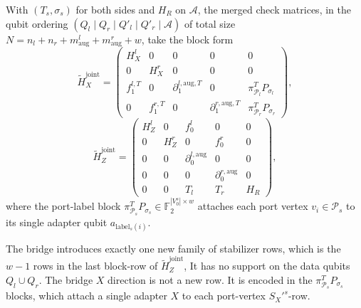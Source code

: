 \documentclass[a4paper, 12pt]{article}
\begin{document}
  With $(T_s, \sigma_s)$ for both sides and $H_R$ on $\mathcal{A}$, the merged
  check matrices, in the qubit ordering
  $(Q_l \mid Q_r \mid Q'_l \mid Q'_r \mid \mathcal{A})$ of total size
  $N = n_l + n_r + m^l_{\mathrm{aug}} + m^r_{\mathrm{aug}} + w$, take the block
  form
  \begin{equation}
  \tilde H_X^{\mathrm{joint}} =
  \begin{pmatrix}
  H_X^l & 0 & 0 & 0 & 0 \\
  0 & H_X^r & 0 & 0 & 0 \\
  f_1^{l,T} & 0 & \partial_1^{l,\mathrm{aug},T} & 0 & \pi_{\mathcal{P}_l}^T P_{\sigma_l} \\
  0 & f_1^{r,T} & 0 & \partial_1^{r,\mathrm{aug},T} & \pi_{\mathcal{P}_r}^T P_{\sigma_r}
  \end{pmatrix},
  \end{equation}
  \begin{equation}
  \tilde H_Z^{\mathrm{joint}} =
  \begin{pmatrix}
  H_Z^l & 0 & f_0^l & 0 & 0 \\
  0 & H_Z^r & 0 & f_0^r & 0 \\
  0 & 0 & \partial_0^{l,\mathrm{aug}} & 0 & 0 \\
  0 & 0 & 0 & \partial_0^{r,\mathrm{aug}} & 0 \\
  0 & 0 & T_l & T_r & H_R
  \end{pmatrix},
  \end{equation}
  where the port-label block $\pi_{\mathcal{P}_s}^T P_{\sigma_s} \in \mathbb{F}_2^{|V_0^s|\times w}$
  attaches each port vertex $v_i \in \mathcal{P}_s$ to its single adapter qubit
  $a_{\mathrm{label}_s(i)}$.

  The bridge introduces exactly one new family of stabilizer rows, which is the
  $w-1$ rows in the last block-row of $\tilde H_Z^{\mathrm{joint}}$,
  It has no support on the data qubits $Q_l\cup Q_r$.
  The bridge $X$ direction is not a new row. It is encoded in the
  $\pi_{\mathcal{P}_s}^T P_{\sigma_s}$ blocks, which attach a single adapter $X$
  to each port-vertex $S_X'^s$-row.
\end{document}

